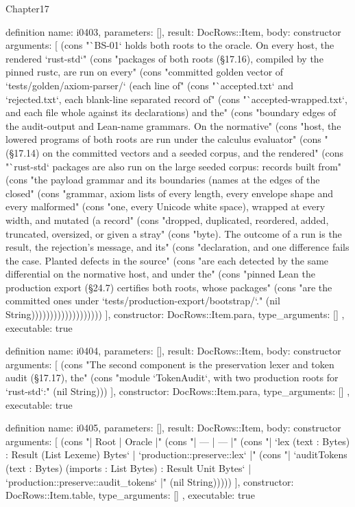 \begin{lexlean}{Chapter17}
\begin{semanticmodule}
definition{
  name: i0403,
  parameters: [],
  result: DocRows::Item,
  body: constructor{
    arguments: [
      (cons "`BS-01` holds both roots to the oracle. On every host, the rendered `rust-std`" (cons "packages of both roots (§17.16), compiled by the pinned rustc, are run on every" (cons "committed golden vector of `tests/golden/axiom-parser/` (each line of" (cons "`accepted.txt` and `rejected.txt`, each blank-line separated record of" (cons "`accepted-wrapped.txt`, and each file whole against its declarations) and the" (cons "boundary edges of the audit-output and Lean-name grammars. On the normative" (cons "host, the lowered programs of both roots are run under the calculus evaluator" (cons "(§17.14) on the committed vectors and a seeded corpus, and the rendered" (cons "`rust-std` packages are also run on the large seeded corpus: records built from" (cons "the payload grammar and its boundaries (names at the edges of the closed" (cons "grammar, axiom lists of every length, every envelope shape and every malformed" (cons "one, every Unicode white space), wrapped at every width, and mutated (a record" (cons "dropped, duplicated, reordered, added, truncated, oversized, or given a stray" (cons "byte). The outcome of a run is the result, the rejection's message, and its" (cons "declaration, and one difference fails the case. Planted defects in the source" (cons "are each detected by the same differential on the normative host, and under the" (cons "pinned Lean the production export (§24.7) certifies both roots, whose packages" (cons "are the committed ones under `tests/production-export/bootstrap/`." (nil String)))))))))))))))))))
    ],
    constructor: DocRows::Item.para,
    type_arguments: []
  },
  executable: true
}

definition{
  name: i0404,
  parameters: [],
  result: DocRows::Item,
  body: constructor{
    arguments: [
      (cons "The second component is the preservation lexer and token audit (§17.17), the" (cons "module `TokenAudit`, with two production roots for `rust-std`:" (nil String)))
    ],
    constructor: DocRows::Item.para,
    type_arguments: []
  },
  executable: true
}

definition{
  name: i0405,
  parameters: [],
  result: DocRows::Item,
  body: constructor{
    arguments: [
      (cons "| Root | Oracle |" (cons "| --- | --- |" (cons "| `lex (text : Bytes) : Result (List Lexeme) Bytes` | `production::preserve::lex` |" (cons "| `auditTokens (text : Bytes) (imports : List Bytes) : Result Unit Bytes` | `production::preserve::audit_tokens` |" (nil String)))))
    ],
    constructor: DocRows::Item.table,
    type_arguments: []
  },
  executable: true
}


\end{semanticmodule}
\end{lexlean}
